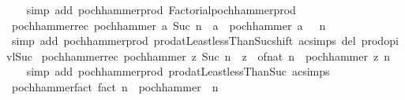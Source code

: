 \begin{isabellebody}
%
\isadelimproof
\ \ %
\endisadelimproof
%
\isatagproof
{}\isamarkupfalse%
\ {\isacharparenleft}{\kern0pt}simp\ add{\isacharcolon}{\kern0pt}\ pochhammer{\isacharunderscore}{\kern0pt}prod\ Factorial{\isachardot}{\kern0pt}pochhammer{\isacharunderscore}{\kern0pt}prod{\isacharparenright}{\kern0pt}%
\endisatagproof
{\isafoldproof}%
%
\isadelimproof
\isanewline
%
\endisadelimproof
\isanewline
{}\isamarkupfalse%
\isanewline
\isanewline
{}\isamarkupfalse%
\ pochhammer{\isacharunderscore}{\kern0pt}rec{\isacharcolon}{\kern0pt}\ {\isachardoublequoteopen}pochhammer\ a\ {\isacharparenleft}{\kern0pt}Suc\ n{\isacharparenright}{\kern0pt}\ {\isacharequal}{\kern0pt}\ a\ {\isacharasterisk}{\kern0pt}\ pochhammer\ {\isacharparenleft}{\kern0pt}a\ {\isacharplus}{\kern0pt}\ {}{\isacharparenright}{\kern0pt}\ n{\isachardoublequoteclose}\isanewline
%
\isadelimproof
\ \ %
\endisadelimproof
%
\isatagproof
{}\isamarkupfalse%
\ {\isacharparenleft}{\kern0pt}simp\ add{\isacharcolon}{\kern0pt}\ pochhammer{\isacharunderscore}{\kern0pt}prod\ prod{\isachardot}{\kern0pt}atLeast{}{\isacharunderscore}{\kern0pt}lessThan{\isacharunderscore}{\kern0pt}Suc{\isacharunderscore}{\kern0pt}shift\ ac{\isacharunderscore}{\kern0pt}simps\ del{\isacharcolon}{\kern0pt}\ prod{\isachardot}{\kern0pt}op{\isacharunderscore}{\kern0pt}ivl{\isacharunderscore}{\kern0pt}Suc{\isacharparenright}{\kern0pt}%
\endisatagproof
{\isafoldproof}%
%
\isadelimproof
\isanewline
%
\endisadelimproof
\isanewline
{}\isamarkupfalse%
\ pochhammer{\isacharunderscore}{\kern0pt}rec{\isacharprime}{\kern0pt}{\isacharcolon}{\kern0pt}\ {\isachardoublequoteopen}pochhammer\ z\ {\isacharparenleft}{\kern0pt}Suc\ n{\isacharparenright}{\kern0pt}\ {\isacharequal}{\kern0pt}\ {\isacharparenleft}{\kern0pt}z\ {\isacharplus}{\kern0pt}\ of{\isacharunderscore}{\kern0pt}nat\ n{\isacharparenright}{\kern0pt}\ {\isacharasterisk}{\kern0pt}\ pochhammer\ z\ n{\isachardoublequoteclose}\isanewline
%
\isadelimproof
\ \ %
\endisadelimproof
%
\isatagproof
{}\isamarkupfalse%
\ {\isacharparenleft}{\kern0pt}simp\ add{\isacharcolon}{\kern0pt}\ pochhammer{\isacharunderscore}{\kern0pt}prod\ prod{\isachardot}{\kern0pt}atLeast{}{\isacharunderscore}{\kern0pt}lessThan{\isacharunderscore}{\kern0pt}Suc\ ac{\isacharunderscore}{\kern0pt}simps{\isacharparenright}{\kern0pt}%
\endisatagproof
{\isafoldproof}%
%
\isadelimproof
\isanewline
%
\endisadelimproof
\isanewline
{}\isamarkupfalse%
\ pochhammer{\isacharunderscore}{\kern0pt}fact{\isacharcolon}{\kern0pt}\ {\isachardoublequoteopen}fact\ n\ {\isacharequal}{\kern0pt}\ pochhammer\ {}\ n{\isachardoublequoteclose}\isanewline

\end{isabellebody}
